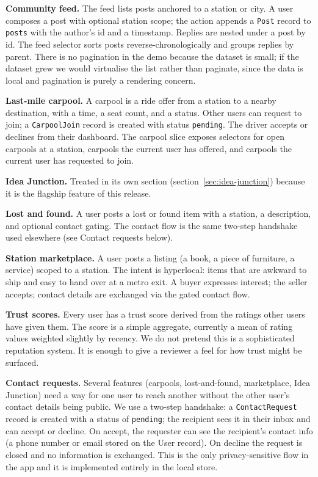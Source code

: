 \documentclass[a4paper,11pt]{article}
\begin{document}
\textbf{Community feed.} The feed lists posts anchored to a station or city.
A user composes a post with optional station scope; the action appends a
\texttt{Post} record to \texttt{posts} with the author's id and a timestamp.
Replies are nested under a post by id. The feed selector sorts posts
reverse-chronologically and groups replies by parent. There is no pagination
in the demo because the dataset is small; if the dataset grew we would
virtualise the list rather than paginate, since the data is local and
pagination is purely a rendering concern.

\textbf{Last-mile carpool.} A carpool is a ride offer from a station to a
nearby destination, with a time, a seat count, and a status. Other users can
request to join; a \texttt{CarpoolJoin} record is created with status
\texttt{pending}. The driver accepts or declines from their dashboard. The
carpool slice exposes selectors for open carpools at a station, carpools the
current user has offered, and carpools the current user has requested to
join.

\textbf{Idea Junction.} Treated in its own section (section~\ref{sec:idea-junction})
because it is the flagship feature of this release.

\textbf{Lost and found.} A user posts a lost or found item with a station, a
description, and optional contact gating. The contact flow is the same
two-step handshake used elsewhere (see Contact requests below).

\textbf{Station marketplace.} A user posts a listing (a book, a piece of
furniture, a service) scoped to a station. The intent is hyperlocal: items
that are awkward to ship and easy to hand over at a metro exit. A buyer
expresses interest; the seller accepts; contact details are exchanged via
the gated contact flow.

\textbf{Trust scores.} Every user has a trust score derived from the ratings
other users have given them. The score is a simple aggregate, currently a
mean of rating values weighted slightly by recency. We do not pretend this is
a sophisticated reputation system. It is enough to give a reviewer a feel for
how trust might be surfaced.

\textbf{Contact requests.} Several features (carpools, lost-and-found,
marketplace, Idea Junction) need a way for one user to reach another without
the other user's contact details being public. We use a two-step handshake: a
\texttt{ContactRequest} record is created with a status of \texttt{pending};
the recipient sees it in their inbox and can accept or decline. On accept, the
requester can see the recipient's contact info (a phone number or email stored
on the User record). On decline the request is closed and no information is
exchanged. This is the only privacy-sensitive flow in the app and it is
implemented entirely in the local store.
\end{document}
